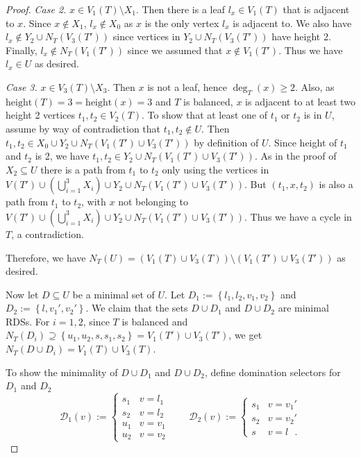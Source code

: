 \documentclass[10pt,a4paper]{amsart}
\newcommand{\calD}{\mathcal{D}}
\newcommand{\hh}{\mbox{height}}
\newcommand\set[1]{\left\lbrace #1 \right\rbrace}
\begin{document}
\begin{proof}
    \emph{Case 2.} $x \in V_1(T)\setminus X_1$. Then there is a leaf $l_x \in V_1(T)$ that is adjacent to $x$.
    Since $x \not\in X_1$, $l_x \not\in X_0$ as $x$ is the only vertex $l_x$ is adjacent to.
    We also have $l_x \not\in Y_2 \cup N_T(V_3(T'))$ since vertices in $Y_2 \cup N_T(V_3(T'))$ have height 2.
    Finally, $l_x \not\in N_T(V_1(T'))$ since we assumed that $x \not\in V_1(T')$.
    Thus we have $l_x \in U$ as desired.
    
    \emph{Case 3.} $x \in V_3(T)\setminus X_3$.
    Then $x$ is not a leaf, hence $\deg_T(x) \geq 2$. 
    Also, as $\hh(T) = 3=\hh(x) = 3$ and $T$ is balanced, $x$ is adjacent to at least two height 2 vertices $t_1,t_2 \in V_2(T)$.
    To show that at least one of $t_1$ or $t_2$ is in $U$, assume by way of contradiction that $t_1,t_2 \not\in U$.
    Then $t_1,t_2 \in X_0 \cup Y_2 \cup N_T(V_1(T') \cup V_3(T'))$ by definition of $U$.
    Since height of $t_1$ and $t_2$ is 2, we have $t_1,t_2 \in Y_2 \cup N_T(V_1(T') \cup V_3(T'))$.
    As in the proof of $X_2 \subseteq U$ there is a path from $t_1$ to $t_2$ only using the vertices in $V(T') \cup \left(\bigcup_{i = 1}^3X_i\right) \cup Y_2 \cup N_T(V_1(T') \cup V_3(T'))$. 
    But $(t_1, x, t_2)$ is also a path from $t_1$ to $t_2$, with $x$ not belonging to $V(T') \cup \left(\bigcup_{i = 1}^3X_i\right) \cup Y_2 \cup N_T(V_1(T') \cup V_3(T'))$.
    Thus we have a cycle in $T$, a contradiction.

    Therefore, we have $N_T(U) = (V_1(T) \cup V_3(T)) \setminus (V_1(T') \cup V_3(T'))$ as desired.

    
    Now let $D \subseteq U$ be a minimal set of $U$.
    Let $D_1 := \set{l_1,l_2,v_1,v_2}$ and $D_2 := \set{l,v_1',v_2'}$.
    We claim that the sets $D \cup D_1$ and $D \cup D_2$ are minimal RDSs.
    For $i = 1,2$, since $T$ is balanced and $N_T(D_i) \supseteq \set{u_1,u_2,s,s_1,s_2} = V_1(T') \cup V_3(T')$, we get $N_T(D \cup D_i) = V_1(T) \cup V_3(T)$.

    To show the minimality of $D \cup D_1$ and $D \cup D_2$, define domination selectors for $D_1$ and $D_2$
    $$
    \calD_1(v) := \begin{cases}
    s_1 & v = l_1\\
    s_2 & v = l_2\\
    u_1 & v = v_1\\
    u_2 & v = v_2
    \end{cases}
    \qquad
    \calD_2(v) := \begin{cases}
        s_1 & v = v_1'\\
        s_2 & v = v_2'\\
        s & v = l\ \ \ .
    \end{cases}
    $$


\end{proof}
\end{document}
